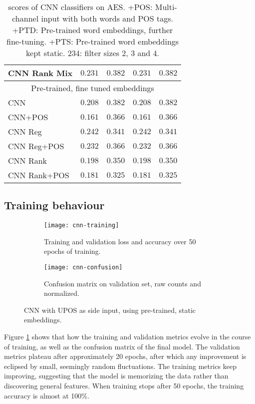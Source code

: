 \begin{table}
\begin{tabular}{lrrrr}
    CNN Rank Mix & $0.231$ & $0.382$ & $0.231$ & $0.382$ \\
    \midrule
    \multicolumn{5}{c}{Pre-trained, fine tuned embeddings} \\
    \midrule
    CNN & $0.208$ & $0.382$ & $0.208$ & $0.382$ \\
    CNN+POS & $0.161$ & $0.366$ & $0.161$ & $0.366$ \\
    CNN Reg & $0.242$ & $0.341$ & $0.242$ & $0.341$ \\
    CNN Reg+POS & $0.232$ & $0.366$ & $0.232$ & $0.366$ \\
    CNN Rank & $0.198$ & $0.350$ & $0.198$ & $0.350$ \\
    CNN Rank+POS & $0.181$ & $0.325$ & $0.181$ & $0.325$ \\
    \bottomrule
  \end{tabular}
  \caption{\FI scores of CNN classifiers on AES. +POS: Multi-channel input with
           both words and POS tags. +PTD: Pre-trained word embeddings, further
           fine-tuning. +PTS: Pre-trained word embeddings kept static. 234:
           filter sizes 2, 3 and 4.}
  \label{tab:cnn-results}
\end{table}


\subsection{Training behaviour}

\begin{figure}
  \begin{subfigure}{\linewidth}
    \centering
    \texttt{[image: cnn-training]}
    \caption{Training and validation loss and accuracy over 50 epochs of training.}
  \end{subfigure}
  \begin{subfigure}{\linewidth}
    \centering
    \texttt{[image: cnn-confusion]}
    \caption{Confusion matrix on validation set, raw counts and normalized.}
  \end{subfigure}
  \caption{CNN with UPOS as side input, using pre-trained, static embeddings.}
  \label{fig:cnn-training}
\end{figure}

Figure \ref{fig:cnn-training} shows that how the training and validation
metrics evolve in the course of training, as well as the confusion matrix of
the final model. The validation metrics plateau after approximately 20
epochs, after which any improvement is eclipsed by small, seemingly random
fluctuations. The training metrics keep improving, suggesting that the model
is memorizing the data rather than discovering general features. When
training stops after 50 epochs, the training accuracy is almost at 100\%.

